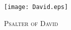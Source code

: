 \fancyhead[RE,LO]{}\fancyhead[RO,LE]{}
\fancyhead[C]{}\thispagestyle{empty}
{}
  \begin{center}
   \texttt{[image: David.eps]}
   \par
   \vspace{2ex}
   	\textsc{\Huge{Psalter of David}}
   \end{center}